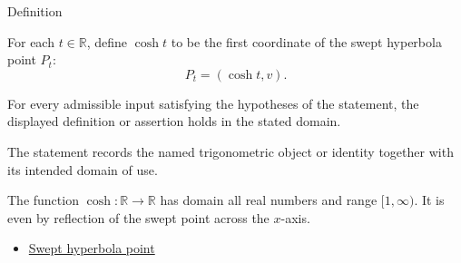 

\begin{definitionbox}{Definition}
\begin{definition}
\label{def:hyperbolic-cosine}
For each $t\in\mathbb{R}$, define $\cosh t$ to be the first coordinate of
the swept hyperbola point $P_t$:
\[
  P_t=(\cosh t,v).
\]
\end{definition}
\end{definitionbox}
\begin{remark*}
For every admissible input satisfying the hypotheses of the statement, the
displayed definition or assertion holds in the stated domain.
\end{remark*}

\begin{remark*}[Interpretation]
The statement records the named trigonometric object or identity together with
its intended domain of use.
\end{remark*}

\begin{remark*}
The function $\cosh:\mathbb{R}\to\mathbb{R}$ has domain all real numbers and
range $[1,\infty)$. It is even by reflection of the swept point across the
$x$-axis.
\end{remark*}
\begin{dependencies}
\begin{itemize}
  \item \hyperref[def:swept-hyperbola-point]{Swept hyperbola point}
\end{itemize}
\end{dependencies}
